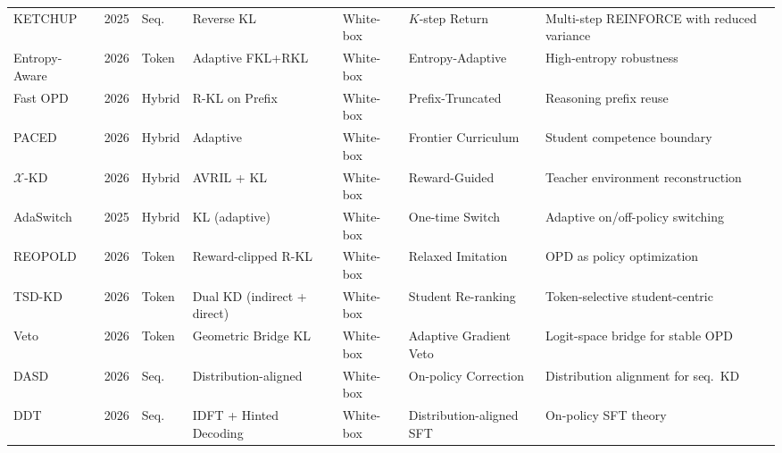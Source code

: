 \documentclass{article} %
\begin{document}
\begin{table}[t]
{\begin{tabular}{@{}lclllll@{}}
        KETCHUP \citep{2504.19024}        & 2025 & Seq.   & Reverse KL          & White-box & $K$-step Return      & Multi-step REINFORCE with reduced variance \\
        Entropy-Aware \citep{2603.07079}  & 2026 & Token  & Adaptive FKL+RKL    & White-box & Entropy-Adaptive     & High-entropy robustness \\
        Fast OPD \citep{2602.15260}        & 2026 & Hybrid & R-KL on Prefix      & White-box & Prefix-Truncated     & Reasoning prefix reuse \\
        PACED \citep{2603.11178}          & 2026 & Hybrid & Adaptive            & White-box & Frontier Curriculum  & Student competence boundary \\
        $\mathcal{X}$-KD \citep{2602.12674} & 2026 & Hybrid & AVRIL + KL  & White-box & Reward-Guided  & Teacher environment reconstruction \\
        AdaSwitch \citep{2510.07842}   & 2025 & Hybrid & KL (adaptive)      & White-box & One-time Switch       & Adaptive on/off-policy switching \\
        REOPOLD \citep{2603.11137}     & 2026 & Token  & Reward-clipped R-KL & White-box & Relaxed Imitation    & OPD as policy optimization \\
        TSD-KD \citep{2603.13260}      & 2026 & Token  & Dual KD (indirect + direct) & White-box & Student Re-ranking & Token-selective student-centric \\
        Veto \citep{2601.07155}        & 2026 & Token  & Geometric Bridge KL & White-box & Adaptive Gradient Veto & Logit-space bridge for stable OPD \\
        DASD \citep{2601.09088}        & 2026 & Seq.   & Distribution-aligned & White-box & On-policy Correction & Distribution alignment for seq.\ KD \\
        DDT \citep{2602.12222}         & 2026 & Seq.   & IDFT + Hinted Decoding & White-box & Distribution-aligned SFT & On-policy SFT theory \\
        \bottomrule
    \end{tabular}
    }
\end{table}
\end{document}
